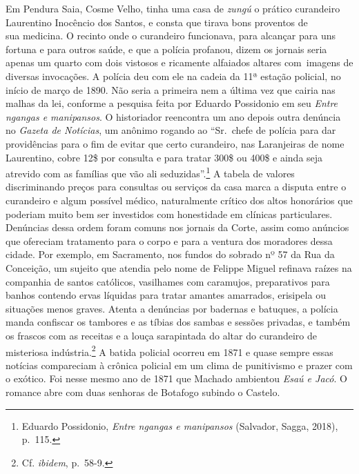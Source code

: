 Em Pendura Saia, Cosme Velho, tinha uma casa de \textit{zungú} o prático
curandeiro Laurentino Inocêncio dos Santos, e consta que tirava bons
proventos de~\\
sua medicina. O recinto onde o curandeiro funcionava, para alcançar para
uns fortuna e para outros saúde, e que a polícia profanou, dizem os
jornais seria apenas um quarto com dois vistosos e ricamente alfaiados
altares com~imagens de diversas invocações. A polícia deu com ele na
cadeia da 11ª estação policial, no início de março de 1890. Não seria a
primeira nem a última vez que cairia nas malhas da lei, conforme a
pesquisa feita por Eduardo Possidonio em seu \textit{Entre ngangas e
manipansos}. O historiador reencontra um ano depois outra denúncia no
\textit{Gazeta de Notícias}, um anônimo rogando ao ``Sr.~chefe de polícia
para dar providências para o fim de evitar que certo curandeiro, nas
Laranjeiras de nome Laurentino, cobre 12\$ por consulta e para tratar
300\$ ou 400\$ e ainda seja atrevido com as famílias que vão ali
seduzidas''.\footnote{Eduardo Possidonio, \textit{Entre ngangas e
  manipansos} (Salvador, Sagga, 2018), p.~115.} A tabela de valores
discriminando preços para consultas ou serviços da casa marca a disputa
entre o curandeiro e algum possível médico, naturalmente crítico dos
altos honorários que poderiam muito bem ser investidos com honestidade
em clínicas particulares. Denúncias dessa ordem foram comuns nos jornais
da Corte, assim como anúncios que ofereciam tratamento para o corpo e
para a ventura dos moradores dessa cidade. Por exemplo, em Sacramento,
nos fundos do sobrado nº 57 da Rua da Conceição, um sujeito que atendia
pelo nome de Felippe Miguel refinava raízes na companhia de santos
católicos, vasilhames com caramujos, preparativos para banhos contendo
ervas líquidas para tratar amantes amarrados, erisipela ou situações
menos graves. Atenta a denúncias por badernas e batuques, a polícia
manda confiscar os tambores e as tíbias dos sambas e sessões privadas, e
também os frascos com as receitas e a louça sarapintada do altar do
curandeiro de misteriosa indústria.\footnote{Cf. \textit{ibidem}, p.~58-9.}
A batida policial ocorreu em 1871 e quase sempre essas notícias
compareciam à crônica policial em um clima de punitivismo e prazer com o
exótico. Foi nesse mesmo ano de 1871 que Machado ambientou \textit{Esaú e
Jacó}. O romance abre com duas senhoras de Botafogo subindo o Castelo.

